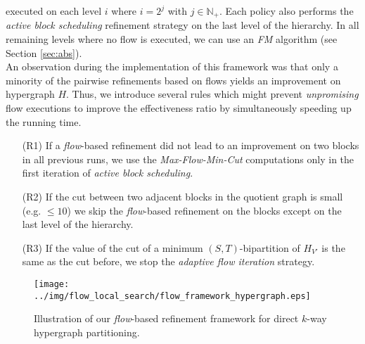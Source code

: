 executed on each level $i$ where $i = 2^j$ with $j \in \mathbb{N}_+$. Each policy also
performs the \emph{active block scheduling} refinement strategy on the last level of the
hierarchy. In all remaining levels where no flow is executed, we can use an 
\emph{FM} algorithm 
\cite{akhremtsev2017engineering,fiduccia1988linear,sanchis1989multiple} (see Section 
\ref{sec:abs}). \\
An observation during the implementation of this framework was that only a minority
of the pairwise refinements based on flows yields an improvement
on hypergraph $H$. Thus, we introduce several rules which might prevent
\emph{unpromising} flow executions to improve the effectiveness ratio by simultaneously speeding up
the running time.

\begin{enumerate}
\item[(R1)] If a \emph{flow}-based refinement did not lead to an improvement on two blocks in all previous
            runs, we use the \emph{Max-Flow-Min-Cut} computations only in the first iteration of 
            \emph{active block scheduling}.
\item[(R2)] If the cut between two adjacent blocks in the quotient graph is small (e.g. $\le 10$) we
            skip the \emph{flow}-based refinement on the blocks except on the last level of the hierarchy.
\item[(R3)] If the value of the cut of a minimum $(S,T)$-bipartition of $H_{V'}$ is the same 
            as the cut before, we stop the \emph{adaptive flow iteration} strategy.
\end{enumerate}

\begin{figure}
\centering 
\texttt{[image: ../img/flow\_local\_search/flow\_framework\_hypergraph.eps]}
\caption{Illustration of our \emph{flow}-based refinement framework for direct $k$-way hypergraph
         partitioning.}
\label{img:flow_framework}
\end{figure} 
